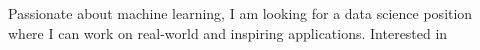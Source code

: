 

\begin{cvparagraph}


Passionate about machine learning, I am looking for a data science position where I can work on real-world and inspiring applications. Interested in


\end{cvparagraph}
